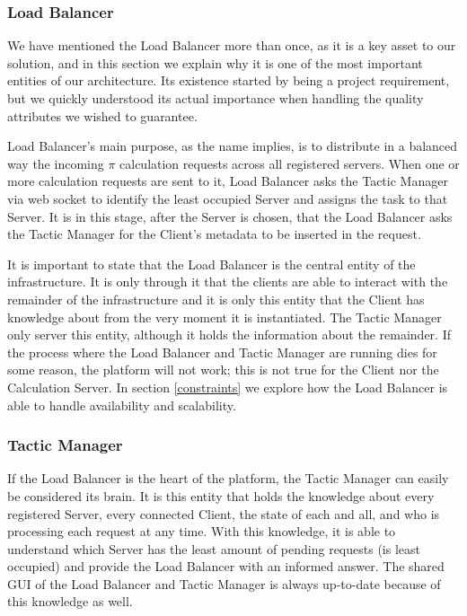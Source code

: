 \documentclass[12pt]{article}
\begin{document}
\subsubsection{Load Balancer} \label{lb}

We have mentioned the Load Balancer more than once, as it is a key asset to our solution, and in this section we explain why it is one of the most important 
entities of our architecture.
Its existence started by being a project requirement, but we quickly understood its actual importance when handling the quality attributes we wished to guarantee.

Load Balancer's main purpose, as the name implies, is to distribute in a balanced way the incoming $\pi$ calculation requests across all registered servers. 
When one or more calculation requests are sent to it, Load Balancer asks the Tactic Manager via web socket to identify the least occupied Server and assigns the 
task to that Server.
It is in this stage, after the Server is chosen, that the Load Balancer asks the Tactic Manager for the Client's metadata to be inserted in the request.

It is important to state that the Load Balancer is the central entity of the infrastructure.
It is only through it that the clients are able to interact with the remainder of the infrastructure and it is only this entity that the Client has knowledge 
about from the very moment it is instantiated.
The Tactic Manager only server this entity, although it holds the information about the remainder.
If the process where the Load Balancer and Tactic Manager are running dies for some reason, the platform will not work; this is not true for the Client nor the 
Calculation Server.
In section \ref{constraints} we explore how the Load Balancer is able to handle availability and scalability.

\subsubsection{Tactic Manager}

If the Load Balancer is the heart of the platform, the Tactic Manager can easily be considered its brain.
It is this entity that holds the knowledge about every registered Server, every connected Client, the state of each and all, and who is processing each request 
at any time.
With this knowledge, it is able to understand which Server has the least amount of pending requests (is least occupied) and provide the Load Balancer with an 
informed answer.
The shared GUI of the Load Balancer and Tactic Manager is always up-to-date because of this knowledge as well.
\end{document}
